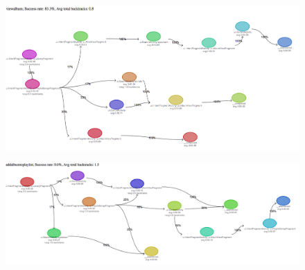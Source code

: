 \begin{figure}
\centering
\includegraphics[angle=90,height=\textheight]{images/results/viewalbum}
\end{figure}

\begin{figure}
\centering
\includegraphics[angle=90,height=\textheight]{images/results/addalbumtoplaylist}
\end{figure}

